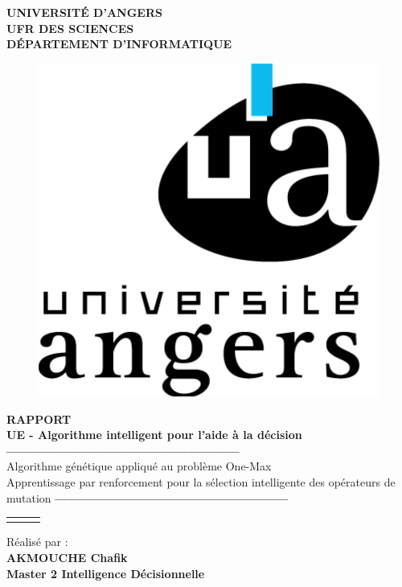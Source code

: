 \documentclass[12pt]{article}
\begin{document}
\thispagestyle{empty}
\begin{center}
\textbf{UNIVERSITÉ D'ANGERS}\\
\textbf{UFR DES SCIENCES}\\
\textbf{DÉPARTEMENT D'INFORMATIQUE}
\end{center}

\begin{figure}[H]
\begin{center}
\includegraphics[scale=0.23]{img/angers.png}
\end{center}
\end{figure}

\begin{center}
\Large{\textbf{RAPPORT}}\\
\Large{\textbf{UE - Algorithme intelligent pour l'aide à la décision}}\\


\textbf{------------------------------------------------------} \\
Algorithme génétique appliqué au problème One-Max  \\
Apprentissage par renforcement pour la sélection intelligente des opérateurs de mutation
\textbf{------------------------------------------------------} \\

\begin{table}[H]
\begin{tabular}{lll}
&&\\

\end{tabular}

\end{table}

Réalisé par :\\
\textbf{AKMOUCHE Chafik} \\

\textbf{Master 2 Intelligence Décisionnelle} \\
\end{center}
\end{document}

